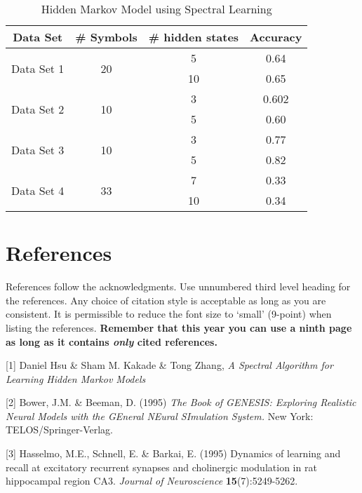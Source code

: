 \documentclass{article} %
\begin{document}
\begin{table}[H]
\caption{Hidden Markov Model using Spectral Learning}
\label{Spectral Learning}
\begin{center}
\begin{tabular}{ |c|c|c|c| }
\hline
\multicolumn{1}{|c|}{\bf Data Set} &\multicolumn{1}{|c|}{\bf \# Symbols} &\multicolumn{1}{|c|}{\bf \# hidden states} &\multicolumn{1}{|c|}{\bf Accuracy}\\
\hline
\multirow{2}{*}{Data Set 1}& \multirow{2}{*}{20} & 5 & 0.64 \\
& & 10 & 0.65 \\
\hline
\multirow{2}{*}{Data Set 2}& \multirow{2}{*}{10} & 3 & 0.602 \\
& & 5 & 0.60 \\
\hline
\multirow{2}{*}{Data Set 3}& \multirow{2}{*}{10} & 3 & 0.77 \\
& & 5 & 0.82 \\
\hline
\multirow{2}{*}{Data Set 4}& \multirow{2}{*}{33} & 7 & 0.33 \\
& & 10 & 0.34 \\
\hline
\end{tabular}
\end{center}
\end{table}

\section*{References}

References follow the acknowledgments. Use unnumbered third level heading for
the references. Any choice of citation style is acceptable as long as you are
consistent. It is permissible to reduce the font size to `small' (9-point) 
when listing the references. {\bf Remember that this year you can use
a ninth page as long as it contains \emph{only} cited references.}

\small{
[1] Daniel Hsu \& Sham M. Kakade \& Tong Zhang, {\it A Spectral Algorithm for Learning Hidden Markov Models}

[2] Bower, J.M. \& Beeman, D. (1995) {\it The Book of GENESIS: Exploring
Realistic Neural Models with the GEneral NEural SImulation System.}
New York: TELOS/Springer-Verlag.

[3] Hasselmo, M.E., Schnell, E. \& Barkai, E. (1995) Dynamics of learning
and recall at excitatory recurrent synapses and cholinergic modulation
in rat hippocampal region CA3. {\it Journal of Neuroscience}
{\bf 15}(7):5249-5262.
}
\end{document}
